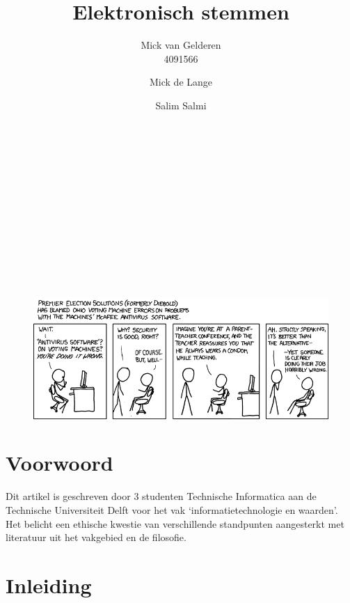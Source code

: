\documentclass[a4paper]{article}
\title{Elektronisch stemmen}
\author{
Mick van Gelderen \\ 4091566 \and 
Mick de Lange \\ \TODO{stdnr} \and
Salim Salmi \\ \TODO{stdnr}
}
\begin{document}
\thispagestyle{plain}
\maketitle

\hfill \\ \\ \\ \\ \\ \\ \\ \\ \\ \\
\begin{figure}[htp]
\centering
\includegraphics[width=\textwidth]{media/voting_machines.png}
\label{fig:voting-machines}

\end{figure}

\newpage

\thispagestyle{plain}

\section*{Voorwoord}
Dit artikel is geschreven door 3 studenten Technische Informatica aan de Technische Universiteit Delft voor het vak `informatietechnologie en waarden'. Het belicht een ethische kwestie van verschillende standpunten aangesterkt met literatuur uit het vakgebied en de filosofie. 

\newpage

\thispagestyle{plain}
\renewcommand{\contentsname}{Inhoud} 
\tableofcontents

\newpage

\section{Inleiding}
\end{document}
